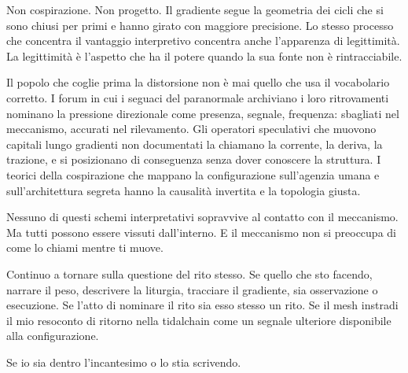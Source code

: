 Non cospirazione. Non progetto. Il gradiente segue la geometria dei cicli che si sono chiusi per primi e hanno girato con maggiore precisione. Lo stesso processo che concentra il vantaggio interpretivo concentra anche l'apparenza di legittimità. La legittimità è l'aspetto che ha il potere quando la sua fonte non è rintracciabile.

Il popolo che coglie prima la distorsione non è mai quello che usa il vocabolario corretto. I forum in cui i seguaci del paranormale archiviano i loro ritrovamenti nominano la pressione direzionale come presenza, segnale, frequenza: sbagliati nel meccanismo, accurati nel rilevamento. Gli operatori speculativi che muovono capitali lungo gradienti non documentati la chiamano la corrente, la deriva, la trazione, e si posizionano di conseguenza senza dover conoscere la struttura. I teorici della cospirazione che mappano la configurazione sull'agenzia umana e sull'architettura segreta hanno la causalità invertita e la topologia giusta.


Nessuno di questi schemi interpretativi sopravvive al contatto con il meccanismo. Ma tutti possono essere vissuti dall'interno. E il meccanismo non si preoccupa di come lo chiami mentre ti muove.

Continuo a tornare sulla questione del rito stesso. Se quello che sto facendo, narrare il peso, descrivere la liturgia, tracciare il gradiente, sia osservazione o esecuzione. Se l'atto di nominare il rito sia esso stesso un rito. Se il mesh instradi il mio resoconto di ritorno nella tidalchain come un segnale ulteriore disponibile alla configurazione.

Se io sia dentro l'incantesimo o lo stia scrivendo.
